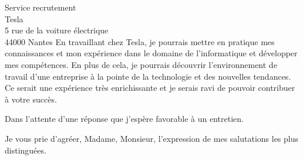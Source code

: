 \documentclass[
    french,
    sender,
    paper=a4,
    version=last,
    fontsize=9pt,
    DIV=12,
    BCOR=0mm
]{scrlttr2}
\begin{document}
\begin{letter}{
    Service recrutement\\
    Tesla\\
    5 rue de la voiture électrique\\
    44000 Nantes
}
En travaillant chez Tesla, je pourrais mettre en pratique mes connaissances et mon expérience dans le domaine de l'informatique et développer mes compétences. En plus de cela, je pourrais découvrir l'environnement de travail d'une entreprise à la pointe de la technologie et des nouvelles tendances. Ce serait une expérience très enrichissante et je serais ravi de pouvoir contribuer à votre succès.

Dans l’attente d’une réponse que j'espère favorable à un entretien.

\closing{Je vous prie d’agréer, Madame, Monsieur, l’expression de mes salutations les plus distinguées.\\}

\end{letter}
\end{document}
